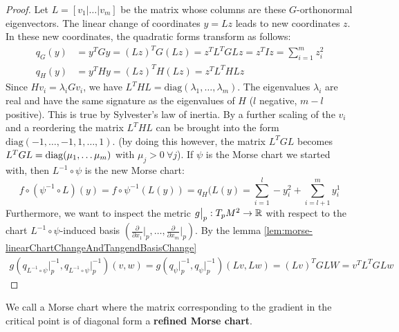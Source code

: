 \begin{proof}
	Let $L = [v_1 | \dots | v_m]$ be the matrix whose columns are these $G$-orthonormal eigenvectors. The linear change of coordinates 
	$y = Lz$ leads to new coordinates $z$. In these new coordinates, the quadratic forms transform as follows:
	\begin{align*}
		q_G(y) &= y^T G y = (Lz)^T G (Lz) = z^T L^T G L z = z^T I z = \sum_{i=1}^m z_i^2 \\
		q_H(y) &= y^T H y = (Lz)^T H (Lz) = z^T L^T H L z
	\end{align*}
	Since $H v_i = \lambda_i G v_i$, we have $L^T H L = \text{diag}(\lambda_1, \dots, \lambda_m)$. The eigenvalues $\lambda_i$ are real and have the same signature as the eigenvalues of $H$ ($l$ negative, $m-l$ positive). This is true by Sylvester's law of inertia. By a further scaling of the $v_i$ and a reordering the matrix $L^T H L$ can be brought into the form $\text{diag}(-1, \dots, -1, 1, \dots, 1)$. (by doing this however, the matrix $L^TGL$ becomes $L^TGL=\mathrm{diag}(\mu_1,\dots \mu_m)$ with $\mu_j>0~\forall j$). If $\psi$ is the Morse chart we started with, then $L^{-1} \circ \psi$ is the new Morse chart: 
	\begin{equation*}
		f\circ (\psi^{-1}\circ L)(y)=f\circ \psi^{-1}(L(y))=q_H(L(y)=\sum_{i=1}^l-y_i^2+\sum_{i=l+1}^my_i^1
	\end{equation*}
	Furthermore, we want to inspect the metric $g\big|_p:T_pM^2\to \mathbb{R}$ with respect to the chart $ L^{-1}\circ \psi $-induced basis $\left( \frac{\partial}{\partial x_1}\big|_p,\dots ,\frac{\partial}{\partial x_m}\big|_p\right)$. By the lemma \ref{lem:morse-linearChartChangeAndTangendBasisChange}
	\begin{align*}
		g(q_{L^{-1}\circ \psi}\big|_p^{-1},q_{L^{-1}\circ \psi}\big|_p^{-1})(v,w)=	g(q_{\psi}\big|_p^{-1},q_{\psi }\big|_p^{-1})(Lv,Lw)=(Lv)^T G LW=v^T L^TGLw	
	\end{align*}
\end{proof}

\begin{definition}
	We call a Morse chart where the matrix corresponding to the gradient in the critical point is of diagonal form a \textbf{refined Morse chart}.
\end{definition} 

